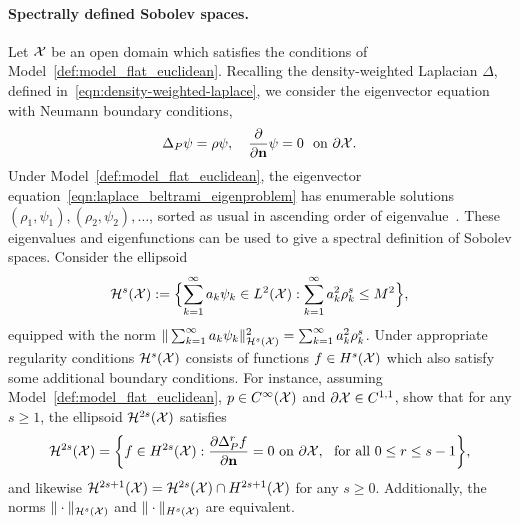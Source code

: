 \paragraph{Spectrally defined Sobolev spaces.}
Let $\mathcal{X}$ be an open domain which satisfies the conditions of Model~\ref{def:model_flat_euclidean}. Recalling the density-weighted Laplacian $\Delta$, defined in~\eqref{eqn:density-weighted-laplace}, we consider the eigenvector equation with Neumann boundary conditions,
\begin{equation}
\label{eqn:laplace_beltrami_eigenproblem}
\Delta_P\psi = \rho \psi, \quad \frac{\partial}{\partial{\bf n}}\psi = 0~~\textrm{on $\partial \mathcal{X}$.}
\end{equation}
Under Model~\ref{def:model_flat_euclidean}, the eigenvector equation~\eqref{eqn:laplace_beltrami_eigenproblem} has enumerable solutions $(\rho_1,\psi_1),(\rho_2,\psi_2),\ldots$, sorted as usual in ascending order of eigenvalue~\citep{garciatrillos18,trillos2019}. These eigenvalues and eigenfunctions can be used to give a spectral definition of Sobolev spaces. Consider the ellipsoid
\begin{equation}
\label{eqn:sobolev_ellipsoid}
\mathcal{H}^{s}(\mathcal{X}) := \Bigl\{\sum_{k = 1}^{\infty} a_k \psi_k \in L^2(\mathcal{X}):  \sum_{k = 1}^{\infty} a_k^2 \rho_k^s \leq M^2 \Bigr\},
\end{equation}
equipped with the norm $\|\sum_{k = 1}^{\infty} a_k \psi_k\|_{\mathcal{H}^s(\mathcal{X})}^2 = \sum_{k = 1}^{\infty} a_k^2 \rho_k^s$. Under appropriate regularity conditions $\mathcal{H}^s(\mathcal{X})$ consists of functions $f \in H^s(\mathcal{X})$ which also satisfy some additional boundary conditions. For instance, assuming Model~\ref{def:model_flat_euclidean}, $p \in C^{\infty}(\mathcal{X})$ and $\partial \mathcal{X} \in C^{1,1}$, \citet{dunlop2020} show that for any $s \geq 1$, the ellipsoid $\mathcal{H}^{2s}(\mathcal{X})$ satisfies
\begin{equation}
\label{eqn:sobolev_ellipsoid_to_sobolev_ball}
\mathcal{H}^{2s}(\mathcal{X}) = 
\biggl\{f \in H^{2s}(\mathcal{X}): \frac{\partial \Delta_P^rf}{\partial {\bf n}} = 0~\textrm{on}~\partial\mathcal{X},~~\textrm{for all $0 \leq r \leq s - 1$} \biggr\},
\end{equation}
and likewise $\mathcal{H}^{2s + 1}(\mathcal{X}) = \mathcal{H}^{2s}(\mathcal{X}) \cap H^{2s + 1}(\mathcal{X})$ for any $s \geq 0$. Additionally, the norms $\|\cdot\|_{\mathcal{H}^s(\mathcal{X})}$ and $\|\cdot\|_{H^s(\mathcal{X})}$ are equivalent.

